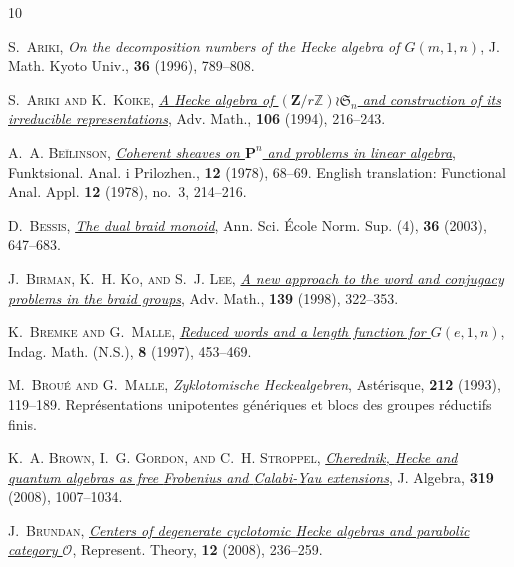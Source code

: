 \documentclass[a4paper,11pt]{amsart}
\numberwithin{equation}{subsection}
\theoremstyle{definition}
\theoremstyle{theorem}
\theoremstyle{remark}
\begin{document}
\begin{thebibliography}{10}

\textsc{S.~Ariki}, \textit{On the decomposition numbers of the {H}ecke algebra
  of {$G(m,1,n)$}}, J. Math. Kyoto Univ., \textbf{36} (1996), 789--808.

\textsc{S.~Ariki and K.~Koike},
  \href{http://dx.doi.org/10.1006/aima.1994.1057}{\textit{A {H}ecke algebra of
  {$(\mathbf{Z}/r\mathbb{Z})\wr\mathfrak{S}_n$} and construction of its
  irreducible representations}}, Adv. Math., \textbf{106} (1994), 216--243.

\textsc{A.~A. Be{\u\i}linson},
  \href{http://dx.doi.org/10.1007/BF01681436}{\textit{Coherent sheaves on
  {$\mathbf{P}^n$} and problems in linear algebra}}, Funktsional. Anal. i
  Prilozhen., \textbf{12} (1978), 68--69.
\newblock English translation: Functional Anal. Appl. \textbf{12} (1978),
  no.~3, 214--216.

\textsc{D.~Bessis},
  \href{http://dx.doi.org/10.1016/j.ansens.2003.01.001}{\textit{The dual braid
  monoid}}, Ann. Sci. \'{E}cole Norm. Sup. (4), \textbf{36} (2003), 647--683.

\textsc{J.~Birman, K.~H. Ko, and S.~J. Lee},
  \href{http://dx.doi.org/10.1006/aima.1998.1761}{\textit{A new approach to the
  word and conjugacy problems in the braid groups}}, Adv. Math., \textbf{139}
  (1998), 322--353.

\textsc{K.~Bremke and G.~Malle},
  \href{http://dx.doi.org/10.1016/S0019-3577(97)81551-0}{\textit{Reduced words
  and a length function for {$G(e,1,n)$}}}, Indag. Math. (N.S.), \textbf{8}
  (1997), 453--469.

\textsc{M.~Brou{\'e} and G.~Malle}, \textit{Zyklotomische {H}eckealgebren},
  Ast\'erisque, \textbf{212} (1993), 119--189.
\newblock Repr{\'e}sentations unipotentes g{\'e}n{\'e}riques et blocs des
  groupes r{\'e}ductifs finis.

\textsc{K.~A. Brown, I.~G. Gordon, and C.~H. Stroppel},
  \href{http://dx.doi.org/10.1016/j.jalgebra.2007.10.026}{\textit{Cherednik,
  {H}ecke and quantum algebras as free {F}robenius and {C}alabi-{Y}au
  extensions}}, J. Algebra, \textbf{319} (2008), 1007--1034.

\textsc{J.~Brundan},
  \href{http://dx.doi.org/10.1090/S1088-4165-08-00333-6}{\textit{Centers of
  degenerate cyclotomic {H}ecke algebras and parabolic category {$\mathcal
  O$}}}, Represent. Theory, \textbf{12} (2008), 236--259.


\end{thebibliography}
\end{document}
